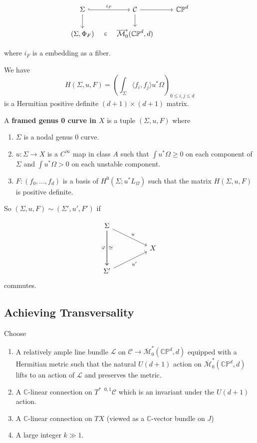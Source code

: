 \[\begin{tikzcd}
	\Sigma & {\mathcal{C}} & {\mathbb{CP}^d} \\
	{(\Sigma, \Phi_F)} & {\overline{\mathcal{M}}_0^*(\mathbb{CP}^d, d)}
	\arrow["{{i_F}}", hook, from=1-1, to=1-2]
	\arrow[from=1-1, to=2-1]
	\arrow[from=1-2, to=1-3]
	\arrow[from=1-2, to=2-2]
	\arrow["\in"{description}, draw=none, from=2-1, to=2-2]
\end{tikzcd}\]

where $i_F$ is a embedding as a fiber.

We have
\[
H(\Sigma, u, F) = \left( \int_\Sigma \langle f_i, f_j \rangle u^*\Omega \right)_{0\le i, j \le d}
\]
is a Hermitian positive definite $(d+1)\times (d+1)$ matrix.

\begin{definition}

A \textbf{framed genus 0 curve in $X$} is a tuple $(\Sigma, u,F)$ where
\begin{enumerate}
\item $\Sigma$ is a nodal genus 0 curve.
\item $u: \Sigma \to X$ is a $C^\infty$ map in class $A$ such that $\int u^*\Omega \ge 0$ on each component of $\Sigma$ and $\int u^*\Omega > 0$ on each unstable component.
\item $F: (f_0,...,f_d)$ is a basis of $H^0(\Sigma; u^*L_\Omega)$ such that the matrix $H(\Sigma, u, F)$ is positive definite.
\end{enumerate}

\end{definition}

So $(\Sigma, u, F)\sim (\Sigma',u', F')$ if

\[\begin{tikzcd}
	\Sigma \\
	&& X \\
	{\Sigma'}
	\arrow["u", from=1-1, to=2-3]
	\arrow["\varphi"', from=1-1, to=3-1]
	\arrow["\cong", from=1-1, to=3-1]
	\arrow["{u'}"', from=3-1, to=2-3]
\end{tikzcd}\]
commutes.

\subsection{Achieving Transversality }

Choose
\begin{enumerate}
\item A relatively ample line bundle $\mathcal{L}$ on $\mathcal{C} \to \overline{\mathcal{M}}_0^* ( \mathbb{CP}^d, d)$ equipped with a Hermitian metric such that the natural $U(d+1)$ action on $\overline{\mathcal{M}}_0^*(\mathbb{CP}^d, d)$ lifts to an action of $\mathcal{L}$ and preserves the metric.
\item A $\mathbb{C}$-linear connection on $T^{*\text{ }0,1} \mathcal{C}$ which is an invariant under the $U(d+1)$ action.
\item A $\mathbb{C}$-linear connection on $TX$ (viewed as a $\mathbb{C}$-vector bundle on $J$)
\item A large integer $k\gg 1$.
\end{enumerate}

